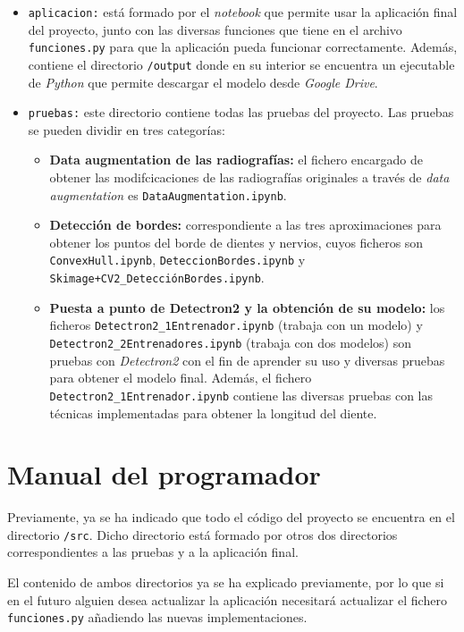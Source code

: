 \begin{itemize}
    \item \texttt{aplicacion:} está formado por el \emph{notebook} que permite usar la aplicación final del proyecto, junto con las diversas funciones que tiene en el archivo \texttt{funciones.py} para que la aplicación pueda funcionar correctamente. Además, contiene el directorio \texttt{/output} donde en su interior se encuentra un ejecutable de \emph{Python} que permite descargar el modelo desde \emph{Google Drive}.
    
    \item \texttt{pruebas:} este directorio contiene todas las pruebas del proyecto. Las pruebas se pueden dividir en tres categorías:
    \begin{itemize}
        \item \textbf{Data augmentation de las radiografías:} el fichero encargado de obtener las modifcicaciones de las radiografías originales a través de \emph{data augmentation} es \texttt{DataAugmentation.ipynb}.
        \item \textbf{Detección de bordes:} correspondiente a las tres aproximaciones para obtener los puntos del borde de dientes y nervios, cuyos ficheros son \texttt{ConvexHull.ipynb}, \texttt{DeteccionBordes.ipynb} y \texttt{Skimage+CV2\_DetecciónBordes.ipynb}. 
        \item \textbf{Puesta a punto de Detectron2 y la obtención de su modelo:} los ficheros \texttt{Detectron2\_1Entrenador.ipynb} (trabaja con un modelo) y \texttt{Detectron2\_2Entrenadores.ipynb} (trabaja con dos modelos) son pruebas con \emph{Detectron2} con el fin de aprender su uso y diversas pruebas para obtener el modelo final. Además, el fichero \texttt{Detectron2\_1Entrenador.ipynb} contiene las diversas pruebas con las técnicas implementadas para obtener la longitud del diente.
    \end{itemize}
\end{itemize}

\section{Manual del programador}
Previamente, ya se ha indicado que todo el código del proyecto se encuentra en el directorio \texttt{/src}. Dicho directorio está formado por otros dos directorios correspondientes a las pruebas y a la aplicación final.

El contenido de ambos directorios ya se ha explicado previamente, por lo que si en el futuro alguien desea actualizar la aplicación necesitará actualizar el fichero \texttt{funciones.py} añadiendo las nuevas implementaciones. 

